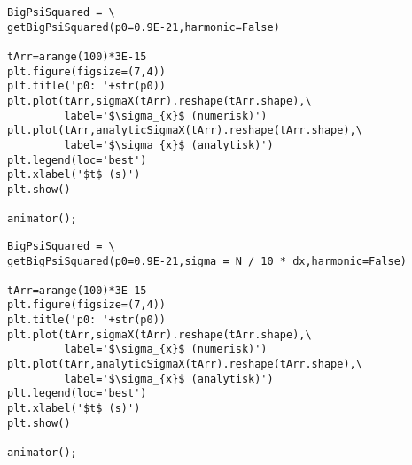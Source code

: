 \documentclass[11pt]{article}
\begin{document}
\begin{figure}
    \begin{center}
    \end{center}
\end{figure}
    
    
    

\begin{lstlisting}
BigPsiSquared = \
getBigPsiSquared(p0=0.9E-21,harmonic=False)

tArr=arange(100)*3E-15
plt.figure(figsize=(7,4))
plt.title('p0: '+str(p0))
plt.plot(tArr,sigmaX(tArr).reshape(tArr.shape),\
         label='$\sigma_{x}$ (numerisk)')
plt.plot(tArr,analyticSigmaX(tArr).reshape(tArr.shape),\
         label='$\sigma_{x}$ (analytisk)')
plt.legend(loc='best')
plt.xlabel('$t$ (s)')
plt.show()

animator();
\end{lstlisting}%
    
\begin{figure}
    \begin{center}
    \end{center}
\end{figure}
    
    
    

\begin{lstlisting}
BigPsiSquared = \
getBigPsiSquared(p0=0.9E-21,sigma = N / 10 * dx,harmonic=False)

tArr=arange(100)*3E-15
plt.figure(figsize=(7,4))
plt.title('p0: '+str(p0))
plt.plot(tArr,sigmaX(tArr).reshape(tArr.shape),\
         label='$\sigma_{x}$ (numerisk)')
plt.plot(tArr,analyticSigmaX(tArr).reshape(tArr.shape),\
         label='$\sigma_{x}$ (analytisk)')
plt.legend(loc='best')
plt.xlabel('$t$ (s)')
plt.show()

animator();
\end{lstlisting}%
    
\begin{figure}
    \begin{center}
    \end{center}
\end{figure}
    
    
    
\end{document}
